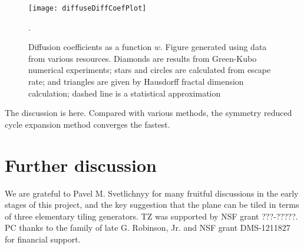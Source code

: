 \documentclass[aps,pre,
                showpacs,
                twocolumn,
                groupedaddress,
                floatfix]{revtex4-1}
\begin{document}
\begin{figure}
\texttt{[image: diffuseDiffCoefPlot]}
  \caption[]{\label{fig-results} Diffusion coefficients as a function $w$.  Figure generated using data from various resources. Diamonds are results from  Green-Kubo numerical experiments; stars and  circles are calculated from escape rate; and triangles are  given by Hausdorff fractal dimension calculation; dashed line  is a statistical approximation}.
\end{figure}
The discussion is here. Compared with various methods, the symmetry reduced cycle expansion method converges the fastest.

\section{Further discussion}


\begin{acknowledgments}
We are grateful to Pavel M. Svetlichnyy for many fruitful discussions in the early stages of this project, and the key suggestion that the plane can be tiled in terms of three elementary tiling generators. TZ was supported by NSF grant ???-?????. PC thanks to the family of late G. Robinson, Jr. and NSF grant DMS-1211827 for financial support.
\end{acknowledgments}

\ifboyscout
\newpage
    
\fi




% 
\end{document}
